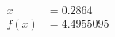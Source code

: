 \documentclass[preview]{standalone}
\begin{document}
\begin{align*}
x &= 0.2864\\f(x) &= 4.4955095
\end{align*}
\end{document}
